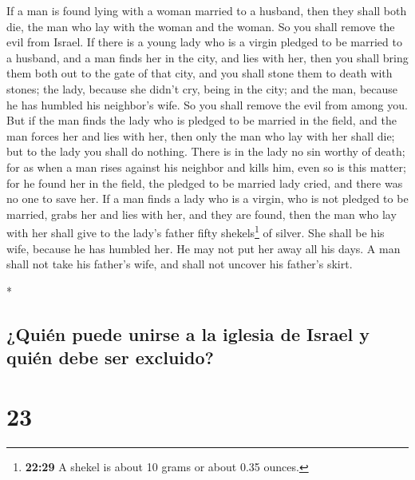 \begin{paracol}{2}
\begin{otherlanguage}{english}
 If a man is found lying with a woman married to a
husband, then they shall both die, the man who lay with the woman and
the woman. So you shall remove the evil from Israel.  If
there is a young lady who is a virgin pledged to be married to a
husband, and a man finds her in the city, and lies with her,
 then you shall bring them both out to the gate of that
city, and you shall stone them to death with stones; the lady, because
she didn't cry, being in the city; and the man, because he has humbled
his neighbor's wife. So you shall remove the evil from among you.
 But if the man finds the lady who is pledged to be
married in the field, and the man forces her and lies with her, then
only the man who lay with her shall die;  but to the lady
you shall do nothing. There is in the lady no sin worthy of death; for
as when a man rises against his neighbor and kills him, even so is this
matter;  for he found her in the field, the pledged to be
married lady cried, and there was no one to save her.  If
a man finds a lady who is a virgin, who is not pledged to be married,
grabs her and lies with her, and they are found,  then
the man who lay with her shall give to the lady's father fifty
shekels\footnote{\textbf{22:29} A shekel is about 10 grams or about 0.35
  ounces.} of silver. She shall be his wife, because he has humbled her.
He may not put her away all his days.  A man shall not
take his father's wife, and shall not uncover his father's skirt.

\end{otherlanguage}

\switchcolumn[0]*

\hypertarget{quiuxe9n-puede-unirse-a-la-iglesia-de-israel-y-quiuxe9n-debe-ser-excluido}{%
\subsection{¿Quién puede unirse a la iglesia de Israel y quién debe ser
excluido?}\label{quiuxe9n-puede-unirse-a-la-iglesia-de-israel-y-quiuxe9n-debe-ser-excluido}}

\hypertarget{section-44}{%
\section{23}\label{section-44}}


\end{paracol}
